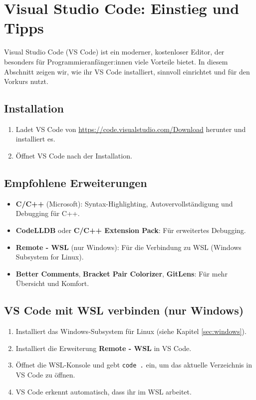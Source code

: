 \chapter{Visual Studio Code: Einstieg und Tipps}
\label{sec:vscode}

Visual Studio Code (VS Code) ist ein moderner, kostenloser Editor, der besonders für Programmieranfänger:innen viele Vorteile bietet. 
In diesem Abschnitt zeigen wir, wie ihr VS Code installiert, sinnvoll einrichtet und für den Vorkurs nutzt.

\section{Installation}
\begin{enumerate}
    \item Ladet VS Code von \url{https://code.visualstudio.com/Download} herunter und installiert es.
    \item Öffnet VS Code nach der Installation.
\end{enumerate}

\section{Empfohlene Erweiterungen}
\begin{itemize}
    \item \textbf{C/C++} (Microsoft): Syntax-Highlighting, Autovervollständigung und Debugging für C++.
    \item \textbf{CodeLLDB} oder \textbf{C/C++ Extension Pack}: Für erweitertes Debugging.
    \item \textbf{Remote - WSL} (nur Windows): Für die Verbindung zu WSL (Windows Subsystem for Linux).
    \item \textbf{Better Comments}, \textbf{Bracket Pair Colorizer}, \textbf{GitLens}: Für mehr Übersicht und Komfort.
\end{itemize}

\section{VS Code mit WSL verbinden (nur Windows)}
\begin{enumerate}
    \item Installiert das Windows-Subsystem für Linux (siehe Kapitel \ref{sec:windows}).
    \item Installiert die Erweiterung \textbf{Remote - WSL} in VS Code.
    \item Öffnet die WSL-Konsole und gebt \texttt{code .} ein, um das aktuelle Verzeichnis in VS Code zu öffnen.
    \item VS Code erkennt automatisch, dass ihr im WSL arbeitet.
\end{enumerate}

